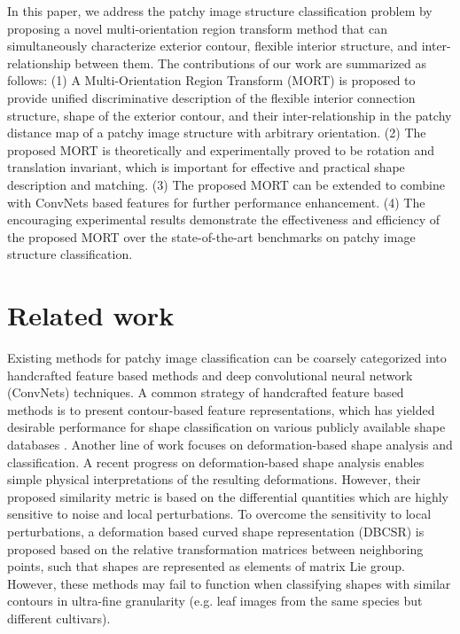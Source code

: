 \documentclass[letterpaper]{article} %
\begin{document}
In this paper, we address the patchy image structure classification problem by proposing a novel multi-orientation region transform method that can simultaneously characterize exterior contour, flexible interior structure, and inter-relationship between them. The contributions of our work are summarized as follows: (1) A Multi-Orientation Region Transform (MORT) is proposed to provide unified discriminative description of the flexible interior connection structure, shape of the exterior contour, and their inter-relationship in the patchy distance map of a patchy image structure with arbitrary orientation. (2) The proposed MORT is theoretically and experimentally proved to be rotation and translation invariant, which is important for effective and practical shape description and matching. (3) The proposed MORT can be extended to combine with ConvNets based features for further performance enhancement. (4) The encouraging experimental results demonstrate the effectiveness and efficiency of the proposed MORT over the state-of-the-art benchmarks on patchy image structure classification.









\section{Related work}
Existing methods for patchy image classification can be coarsely categorized into handcrafted feature based methods and deep convolutional neural network (ConvNets) techniques. A common strategy of handcrafted feature based methods is to present contour-based feature representations, which has yielded desirable performance for shape classification on various publicly available shape databases \cite{7,11,25,28}. Another line of work focuses on deformation-based shape analysis and classification. A recent progress on deformation-based shape analysis \cite{20} enables simple physical interpretations of the resulting deformations. However, their proposed similarity metric is based on the differential quantities which are highly sensitive to noise and local perturbations. To overcome the sensitivity to local perturbations, a deformation based curved shape representation (DBCSR) \cite{4} is proposed based on the relative transformation matrices between neighboring points, such that shapes are represented as elements of matrix Lie group. However, these methods may fail to function when classifying shapes with similar contours in ultra-fine granularity (e.g. leaf images from the same species but different cultivars).
\end{document}

